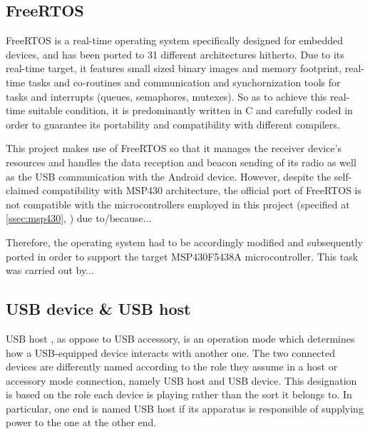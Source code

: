 		\subsection{FreeRTOS}
		\label{ssec:FreeRTOS}
			FreeRTOS is a real-time operating system specifically designed for embedded devices, and has been
			ported to 31 different architectures hitherto. Due to its real-time target, it features small sized
			binary images and memory footprint, real-time tasks and co-routines and communication and
			synchornization tools for tasks and interrupts (queues, semaphores, mutexes). So as to achieve this
			real-time suitable condition, it is predominantly written in C and carefully coded in order to
			guarantee its portability and compatibility with different compilers.

			This project makes use of FreeRTOS so that it manages the receiver device's resources and handles
			the data reception and beacon sending of its radio as well as the USB communication with the Android
			device. However, despite the self-claimed compatibility with MSP430 architecture, the official port
			of FreeRTOS is not compatible with the microcontrollers employed in this project (specified at
			\autoref{ssec:msp430}, ) due to/because... 

			Therefore, the operating system had to be accordingly modified and subsequently ported in order to
			support the target MSP430F5438A microcontroller. This task was carried out by... 




		
		\subsection{USB device \& USB host}
			USB host \cite{usbhost}, as oppose to USB accessory, is an operation mode which determines how a
			USB-equipped device interacts with another one. The two connected devices are differently named
			according to the role they assume in a host or accessory mode connection, namely USB host and USB
			device. This designation is based on the role each device is playing rather than the sort it belongs
			to. In particular, one end is named USB host if its apparatus is responsible of supplying power to
			the one at the other end.\\

